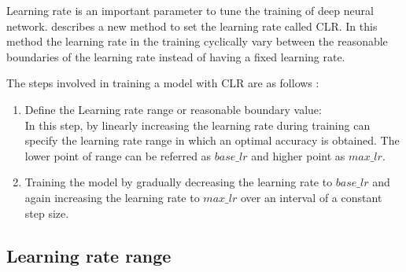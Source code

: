 Learning rate is an important parameter to tune the training of deep neural network. \parencite{Smith.03062015} describes a new method to set the learning rate called \acf{CLR}. In this method the learning rate in the training cyclically vary between the reasonable boundaries of the learning rate instead of having a fixed learning rate.

The steps involved in training a model with \acs{CLR} are as follows :

\begin{enumerate}
    \item Define the Learning rate range or reasonable boundary value: \\
    In this step, by linearly increasing the learning rate during training can specify the learning rate range in which an optimal accuracy is obtained. The lower point of range can be referred as $base\_lr$ and higher point as $max\_lr$.
    \item Training the model by gradually decreasing the learning rate to $base\_lr$ and again increasing the learning rate to $max\_lr$ over an interval of a constant step size.
\end{enumerate}


\subsection{Learning rate range}

